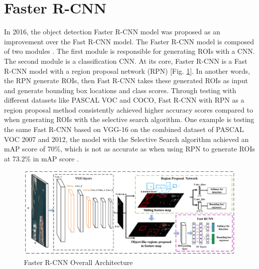 \section{Faster R-CNN}  \label{sec:faster_rcnn}

In 2016, the object detection Faster R-CNN model was proposed as an improvement over the Fast R-CNN model. The Faster R-CNN model is composed of two modules . The first module is responsible for generating ROIs with a CNN. The second module is a classification CNN. At its core, Faster R-CNN is a Fast R-CNN model with a region proposal network (RPN) [Fig. \ref{fig:faster_rcnn_archite}]. In another words, the RPN generate ROIs, then Fast R-CNN takes these generated ROIs as input and generate bounding box locations and class scores. Through testing with different datasets like PASCAL VOC and COCO, Fast R-CNN with RPN as a region proposal method consistently achieved higher accuracy scores compared to when generating ROIs with the selective search algorithm. One example is testing the same Fast R-CNN based on VGG-16 on the combined dataset of PASCAL VOC 2007 and 2012, the model with the Selective Search algorithm achieved an mAP score of 70\%, which is not as accurate as when using RPN to generate ROIs at 73.2\% in mAP score \cite{faster_rcnn_2015}.

\begin{figure}[!ht]
    \centering
    \includegraphics[width=5in]{figures/faster_rcnn_archite.png}
    \caption{Faster R-CNN Overall Architecture \cite{faster_rcnn_architecture_fig}} \label{fig:faster_rcnn_archite}
\end{figure}

